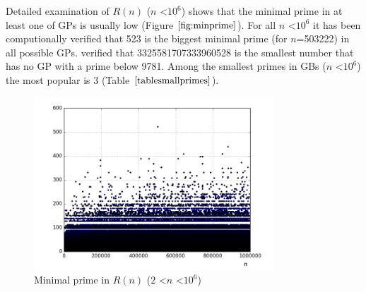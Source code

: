 \documentclass[10pt,twocolumn]{article}
\begin{document}
Detailed examination of $R(n)$ ($n$ \textless $10^6$) shows that the minimal prime in at least one of GPs is usually low (Figure $\ref{fig:minprime}$). For all $n$ \textless $10^6$  it has been computionally verified that 523 is the biggest minimal prime (for $n$=503222) in all possible GPs. \cite{oliveira2012} verified that 3325581707333960528 is the smallest number that has no GP with a prime below 9781. Among the smallest primes in GBs ($n$ \textless $10^6$) the most popular is 3 (Table $\ref{tablesmallprimes}$). \par

\begin{figure}[!ht]
\centering
\includegraphics[width=9cm]{f_min_prime_in_sum}
\caption{Minimal prime in $R(n)$ ($2$ \textless $n$ \textless $10^6$)}
\label{fig:minprime}
\end{figure}
\end{document}
